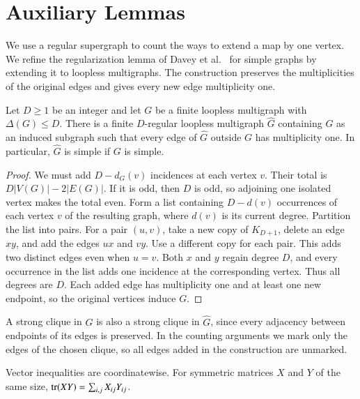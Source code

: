 \section{Auxiliary Lemmas}\label{sec:auxiliary}

We use a regular supergraph to count the ways to extend a map by one
vertex. We refine the regularization lemma of Davey et
al.~\cite{DaveyEtAlStrong2026} for simple graphs by extending it to
loopless multigraphs. The construction preserves the multiplicities
of the original edges and gives every new edge multiplicity one.

\begin{lemma}\label{lem:regularization}
Let $D\geq1$ be an integer and let $G$ be a finite loopless multigraph
with $\Delta(G)\leq D$. There is a finite $D$-regular loopless multigraph
$\widehat G$ containing $G$ as an induced subgraph such that every
edge of $\widehat G$ outside $G$ has multiplicity one. In particular, $\widehat G$ is simple
if $G$ is simple.
\end{lemma}

\begin{proof}
We must add $D-d_G(v)$ incidences at each vertex $v$. Their total
is $D|V(G)|-2|E(G)|$. If it is odd, then $D$ is odd, so adjoining one
isolated vertex makes the total even. Form a list containing $D-d(v)$
occurrences of each vertex $v$ of the resulting graph, where $d(v)$ is
its current degree. Partition the list into pairs. For a pair $(u,v)$,
take a new copy of $K_{D+1}$, delete an edge $xy$, and add the edges
$ux$ and $vy$. Use a different copy for each pair. This adds two
distinct edges even when $u=v$. Both $x$ and $y$ regain degree $D$,
and every occurrence in the list adds one incidence at the
corresponding vertex. Thus all degrees are $D$. Each added edge has
multiplicity one and at least one new endpoint, so the original
vertices induce $G$.
\end{proof}

A strong clique in $G$ is also a strong clique in $\widehat G$, since
every adjacency between endpoints of its edges is preserved. In the
counting arguments we mark only the edges of the chosen clique, so
all edges added in the construction are unmarked.

Vector inequalities are coordinatewise. For symmetric matrices $X$
and $Y$ of the same size, $\operatorname{tr}(XY)=\sum_{i,j}X_{ij}Y_{ij}$.

